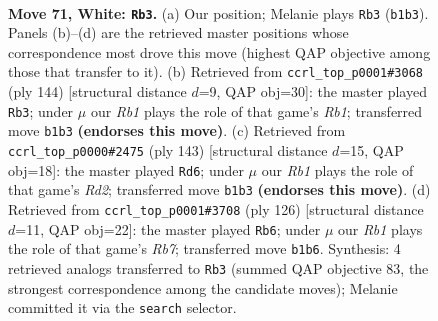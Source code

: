 \documentclass[11pt]{article}
\begin{document}
\clearpage

\begin{figure}[p]\centering
\begin{subfigure}{0.46\textwidth}\centering
\resizebox{\linewidth}{!}{%
\newchessgame
\chessboard[
  setfen={8/5kp1/2N2p2/7p/3P3P/6PK/3r4/1R6 w - - 35 71},
  showmover=false,
  pgfstyle=straightmove, color=movearrow, markmove={b1-b3}
]}
\caption{}
\end{subfigure}\hfill
\begin{subfigure}{0.46\textwidth}\centering
\resizebox{\linewidth}{!}{%
\newchessgame
\chessboard[
  setfen={8/5pk1/6p1/7p/4P2P/5PK1/4r3/1R6 w - - 1 73},
  showmover=false,
  pgfstyle=straightmove, color=movearrow, markmove={b1-b3}
]}
\caption{}
\end{subfigure}
\\[4pt]
\begin{subfigure}{0.46\textwidth}\centering
\resizebox{\linewidth}{!}{%
\newchessgame
\chessboard[
  setfen={8/3r1pk1/7p/1R4pP/6P1/5PK1/8/8 b - - 18 72},
  showmover=false,
  pgfstyle=straightmove, color=movearrow, markmove={d7-d6}
]}
\caption{}
\end{subfigure}\hfill
\begin{subfigure}{0.46\textwidth}\centering
\resizebox{\linewidth}{!}{%
\newchessgame
\chessboard[
  setfen={8/1R6/4pk2/6p1/3r2Pp/7P/5PK1/8 w - - 15 64},
  showmover=false,
  pgfstyle=straightmove, color=movearrow, markmove={b7-b6}
]}
\caption{}
\end{subfigure}
\caption{\textbf{Move 71, White: \texttt{Rb3}.} (a) Our position; Melanie plays \texttt{Rb3} (\texttt{b1b3}). Panels (b)--(d) are the retrieved master positions whose correspondence most drove this move (highest QAP objective among those that transfer to it). (b) Retrieved from \texttt{ccrl\_top\_p0001\#3068} (ply 144) [structural distance $d$=9, QAP obj=30]: the master played \texttt{Rb3}; under $\mu$ our \emph{Rb1} plays the role of that game's \emph{Rb1}; transferred move \texttt{b1b3} \textbf{(endorses this move)}. (c) Retrieved from \texttt{ccrl\_top\_p0000\#2475} (ply 143) [structural distance $d$=15, QAP obj=18]: the master played \texttt{Rd6}; under $\mu$ our \emph{Rb1} plays the role of that game's \emph{Rd2}; transferred move \texttt{b1b3} \textbf{(endorses this move)}. (d) Retrieved from \texttt{ccrl\_top\_p0001\#3708} (ply 126) [structural distance $d$=11, QAP obj=22]: the master played \texttt{Rb6}; under $\mu$ our \emph{Rb1} plays the role of that game's \emph{Rb7}; transferred move \texttt{b1b6}. Synthesis: 4 retrieved analogs transferred to \texttt{Rb3} (summed QAP objective 83, the strongest correspondence among the candidate moves); Melanie committed it via the \texttt{search} selector.}
\label{fig:thought-m140}
\end{figure}
\end{document}
